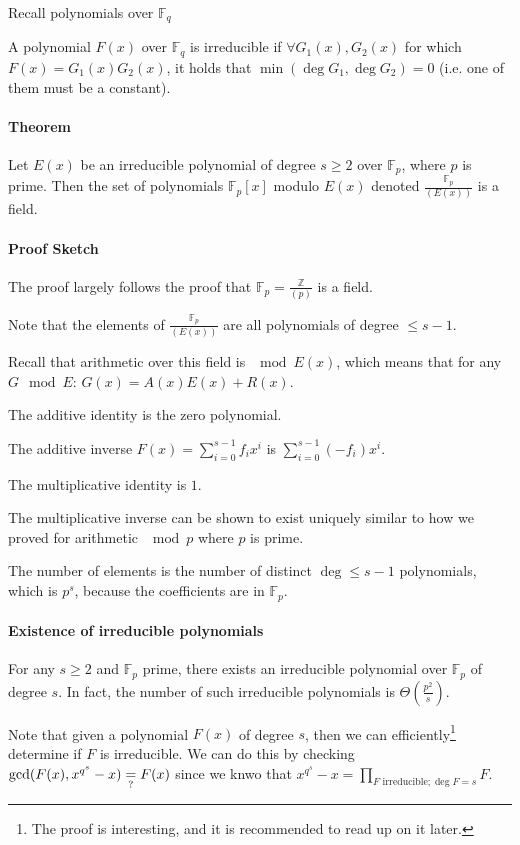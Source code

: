 \documentclass{idc_msc}
\newcommand{\Fq}[1][q]{{\mathbb{F}_{#1}}}
\begin{document}
Recall polynomials over \(\Fq\)

A polynomial \(F(x)\) over \(\Fq\) is irreducible if \(\forall G_1(x), G_2(x)\) for which \(F(x) = G_1(x)G_2(x)\), it holds that \(\min(\deg G_1, \deg G_2) = 0\) (i.e. one of them must be a constant).

\paragraph{Theorem}

Let \(E(x)\) be an irreducible polynomial of degree \(s \ge 2\) over \(\Fq[p]\), where \(p\) is prime.
Then the set of polynomials \(\Fq[p][x]\) modulo \(E(x)\) denoted \(\frac{\Fq[p]}{(E(x))}\) is a field.

\paragraph{Proof Sketch}

The proof largely follows the proof that \(\Fq[p] = \frac{\mathbb{Z}}{(p)}\) is a field.

Note that the elements of \(\frac{\Fq[p]}{(E(x))}\) are all polynomials of degree \(\le s - 1\).

Recall that arithmetic over this field is \(\mod E(x)\), which means that for any \(G \mod E\):
\(G(x) = A(x)E(x) + R(x)\).

The additive identity is the zero polynomial.

The additive inverse \(F(x) = \sum_{i=0}^{s-1} f_i x^i\) is \(\sum_{i=0}^{s-1} (-f_i) x^i\).

The multiplicative identity is \(1\).

The multiplicative inverse can be shown to exist uniquely similar to how we proved for arithmetic \(\mod p\) where \(p\) is prime.

The number of elements is the number of distinct \(\deg \le s-1\) polynomials, which is \(p^s\), because the coefficients are in \(\Fq[p]\).

\paragraph{Existence of irreducible polynomials}

For any \(s \ge 2\) and \(\Fq[p]\) prime, there exists an irreducible polynomial over \(\Fq[p]\) of degree \(s\).
In fact, the number of such irreducible polynomials is \(\Theta\left(\frac{p^2}{s}\right)\).

Note that given a polynomial \(F(x)\) of degree \(s\), then we can efficiently\footnote{The proof is interesting, and it is recommended to read up on it later.} determine if \(F\) is irreducible.
We can do this by checking \(\gcd(F(x), x^{q^s}-x) \underrel{?}{=} F(x)\) since we knwo that \(x^{q^s}-x = \prod_{F\text{ irreducible}; \deg F = s} F\).
\end{document}
